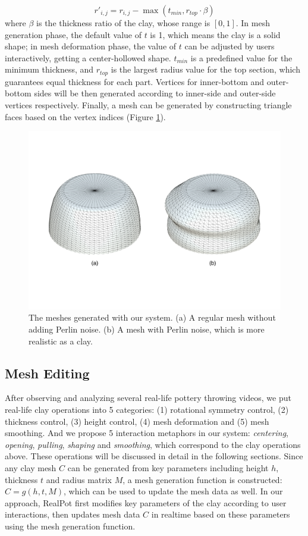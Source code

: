 \documentclass{svjour3}                     %
\begin{document}
\begin{equation}
r'_{i,j} = r_{i,j} - \max(t_{min}, r_{top} \cdot \beta)
\end{equation}
where $\beta$ is the thickness ratio of the clay, whose range is $[0,1]$. In mesh generation phase, the default value of $t$ is 1, which means the clay is a solid shape; in mesh deformation phase, the value of $t$ can be adjusted by users interactively, getting a center-hollowed shape. $t_{min}$ is a predefined value for the minimum thickness, and $r_{top}$ is the largest radius value for the top section, which guarantees equal thickness for each part.
Vertices for inner-bottom and outer-bottom sides will be then generated according to inner-side and outer-side vertices respectively. Finally, a mesh can be generated by constructing triangle faces based on the vertex indices (Figure \ref{fig:mesh}).

\begin{figure}
\includegraphics[width=\textwidth]{fig6}
\caption{The meshes generated with our system. (a) A regular mesh without adding Perlin noise. (b) A mesh with Perlin noise, which is more realistic as a clay.}
\label{fig:mesh}
\end{figure}

\subsection{Mesh Editing}
\label{sec:editing}
After observing and analyzing several real-life pottery throwing videos, we put real-life clay operations into 5 categories: (1) rotational symmetry control, (2) thickness control, (3) height control, (4) mesh deformation and (5) mesh smoothing.
And we propose 5 interaction metaphors in our system: \textit{centering}, \textit{opening}, \textit{pulling}, \textit{shaping} and \textit{smoothing}, which correspond to the clay operations above.
These operations will be discussed in detail in the following sections.
Since any clay mesh $C$ can be generated from key parameters including height $h$, thickness $t$ and radius matrix $M$, a mesh generation function is constructed: $C =  g(h, t, M)$, which can be used to update the mesh data as well.
In our approach, RealPot first modifies key parameters of the clay according to user interactions, then updates mesh data $C$ in realtime based on these parameters using the mesh generation function.
\end{document}
